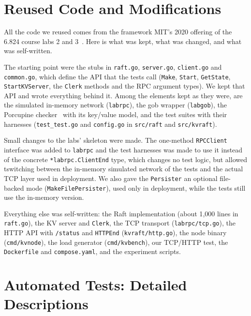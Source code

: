\documentclass[conference]{IEEEtran}
\begin{document}
\section{Reused Code and Modifications}
\label{sec:algs-reuse}
All the code we reused comes from the framework MIT's 2020 offering of the 6.824 course labs 2 and 3~\cite{mit6824}. Here is what was kept, what was changed, and what was self-written.

The starting point were the stubs in \texttt{raft.go}, \texttt{server.go}, \texttt{client.go} and \texttt{common.go}, which define the API that the tests call (\texttt{Make}, \texttt{Start}, \texttt{GetState}, \texttt{StartKVServer}, the \texttt{Clerk} methods and the RPC argument types). We kept that API and wrote everything behind it. Among the elements kept as they were, are the simulated in-memory network (\texttt{labrpc}), the gob wrapper (\texttt{labgob}), the Porcupine checker~\cite{porcupine} with its key/value model, and the test suites with their harnesses (\texttt{test\_test.go} and \texttt{config.go} in \texttt{src/raft} and \texttt{src/kvraft}).

Small changes to the labs' skeleton were made. The one-method \texttt{RPCClient} interface was added to \texttt{labrpc} and the test harnesses was made to use it instead of the concrete \texttt{*labrpc.ClientEnd} type, which changes no test logic, but allowed tswitching between the in-memory simulated network of the tests and the actual TCP layer used in deployment. We also gave the \texttt{Persister} an optional file-backed mode (\texttt{MakeFilePersister}), used only in deployment, while the tests still use the in-memory version.

Everything else was self-written: the Raft implementation (about 1{,}000 lines in \texttt{raft.go}), the KV server and \texttt{Clerk}, the TCP transport (\texttt{labrpc/tcp.go}), the HTTP API with \texttt{/status} and \texttt{HTTPEnd} (\texttt{kvraft/http.go}), the node binary (\texttt{cmd/kvnode}), the load generator (\texttt{cmd/kvbench}), our TCP/HTTP test, the \texttt{Dockerfile} and \texttt{compose.yaml}, and the experiment scripts.

\section{Automated Tests: Detailed Descriptions}
\label{sec:correct-tests-detail}
\end{document}
